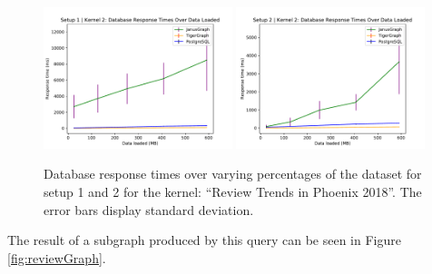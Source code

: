 \begin{figure}[h]
    \centering
    \includegraphics[width=0.49\textwidth]{img/perfResults/reviewsPlotSetup1.pdf}
    \includegraphics[width=0.49\textwidth]{img/perfResults/reviewsPlotSetup2.pdf}
    \caption{Database response times over varying percentages of the dataset for setup 1 and 2 for the kernel: ``Review Trends in Phoenix 2018''. The error bars display standard deviation.}
    \label{fig:reviewPerfResults}
\end{figure}


The result of a subgraph produced by this query can be seen in Figure \ref{fig:reviewGraph}.

